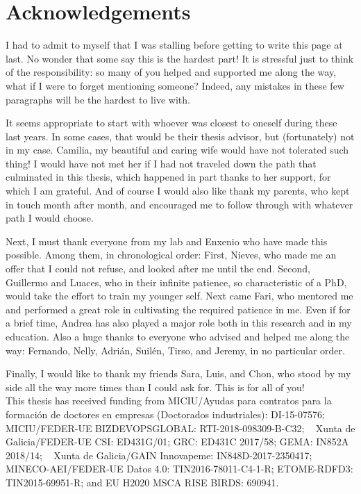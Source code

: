 \chapter*{Acknowledgements}
I had to admit to myself that I was stalling before getting to write this page at last. No wonder that some say this is the hardest part! It is stressful just to think of the responsibility: so many of you helped and supported me along the way, what if I were to forget mentioning someone? Indeed, any mistakes in these few paragraphs will be the hardest to live with.

It seems appropriate to start with whoever was closest to oneself during these last years. In some cases, that would be their thesis advisor, but (fortunately) not in my case. Camilia, my beautiful and caring wife would have not tolerated such thing! I would have not met her if I had not traveled down the path that culminated in this thesis, which happened in part thanks to her support, for which I am grateful. And of course I would also like thank my parents, who kept in touch month after month, and encouraged me to follow through with whatever path I would choose.

Next, I must thank everyone from my lab and Enxenio who have made this possible. Among them, in chronological order: First, Nieves, who made me an offer that I could not refuse, and looked after me until the end. Second, Guillermo and Luaces, who in their infinite patience, so characteristic of a PhD, would take the effort to train my younger self. Next came Fari, who mentored me and performed a great role in cultivating the required patience in me. Even if for a brief time, Andrea has also played a major role both in this research and in my education. Also a huge thanks to everyone who advised and helped me along the way: Fernando, Nelly, Adri\'an, Suil\'en, Tirso, and Jeremy, in no particular order.

Finally, I would like to thank my friends Sara, Luis, and Chon, who stood by my side all the way more times than I could ask for. This is for all of you!\\

\vspace*{\fill}
\small{This thesis has received funding from MICIU/Ayudas para contratos para la formaci\'on de doctores en empresas (Doctorados industriales): DI-15-07576; ~ MICIU/FEDER-UE BIZDEVOPSGLOBAL: RTI-2018-098309-B-C32; ~  Xunta de Galicia/FEDER-UE CSI: ED431G/01; GRC: ED431C 2017/58; GEMA: IN852A 2018/14; ~ Xunta de Galicia/GAIN Innovapeme: IN848D-2017-2350417; ~ MINECO-AEI/FEDER-UE Datos 4.0: TIN2016-78011-C4-1-R; ETOME-RDFD3: TIN2015-69951-R; and EU H2020 MSCA RISE BIRDS: 690941.}

